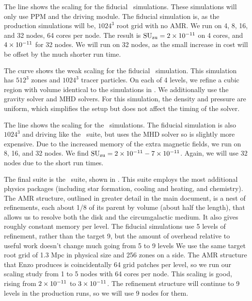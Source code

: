 \documentclass[11pt]{NSF}  %
\begin{document}
The  line shows the scaling for the fiducial \nameTurbulence\
simulations.  These simulations will only use PPM and the driving module.  The
fiducial simulation is, as the production simulations will be, $1024^3$ root
grid with no AMR.
 We run on 4, 8, 16, and 32 nodes, 64 cores per node.  The result is
$\rm{SU}_{\rm{zu}}=2\times {10^{-11}}$ on 4 cores, and $4\times {10^{-11}}$ for 32 nodes.  We will run on 32
nodes, as the small increase in cost will be offset by the much shorter run
time.

The  curve shows the weak scaling for the fiducial \nameCores\
simulation.  This simulation has $512^3$ zones and $1024^3$ tracer particles.
On each of 4 levels, we refine a cubic region with volume identical to the simulations
in \citep{Collins12}.  We additionally use the gravity solver and MHD solvers.
For this simulation, the density and pressure are uniform, which simplifies the
setup but does not affect the timing of the solver.  \red{what number I use}

The \red{red} line shows the scaling for the \nameCMB\ simulations. The fiducial
simulation is also $1024^3$ and driving like the \nameTurbulence\ suite, but uses the MHD solver so is slightly more
expensive.  Due to the increased memory of the extra magnetic fields, we run on
8, 16, and 32 nodes.  We find $\rm{SU}_{\rm{zu}}=2\times {10^{-11}}-7\times {10^{-11}}$.  
Again, we will use 32 nodes due to the short run times.

The final suite is the \nameGalaxies\ suite, shown in .  This suite
employs the most additional physics packages (including star formation,
cooling and heating, and chemistry).  The AMR structure, outlined in greater
detail in the main document, is a nest of refinements, each about 1/8 of its
parent by volume (about half the length), that allows us to resolve both the disk and the circumgalactic medium.
It also gives roughly constant memory per level.
The fiducial simulations use 5 levels of refinement, rather than the target
9, but the amount of overhead relative to useful work doesn't change much going
from 5 to 9 levels  We use the same target root grid of 1.3 Mpc in physical
size and 256 zones on a side.  The AMR structure that Enzo produces is coincidentally 64 grid
patches per level, so we run our scaling study from 1 to 5 nodes with 64 cores
per node.     
This scaling is good, rising from $2\times {10^{-11}}$ to $3\times {10^{-11}}$. The refinement
structure will continue to 9 levels in the production runs, so we will use 9
nodes for them.  
\end{document}
